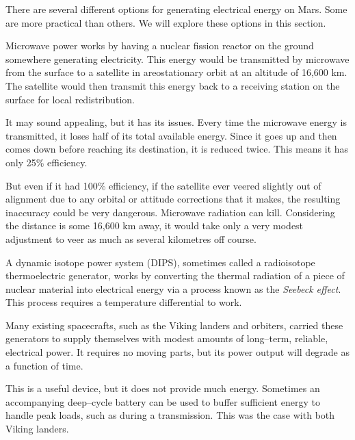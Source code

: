 

There are several different options for generating electrical energy on Mars. Some are more practical than others. We will explore these options in this section.

Microwave power works by having a nuclear fission reactor on the ground somewhere generating electricity. This energy would be transmitted by microwave from the surface to a satellite in areostationary orbit at an altitude of 16,600 km. The satellite would then transmit this energy back to a receiving station on the surface for local redistribution.

It may sound appealing, but it has its issues. Every time the microwave energy is transmitted, it loses half of its total available energy. Since it goes up and then comes down before reaching its destination, it is reduced twice. This means it has only 25\% efficiency.

But even if it had 100\% efficiency, if the satellite ever veered slightly out of alignment due to any orbital or attitude corrections that it makes, the resulting inaccuracy could be very dangerous. Microwave radiation can kill. Considering the distance is some 16,600 km away, it would take only a very modest adjustment to veer as much as several kilometres off course.

A dynamic isotope power system (DIPS), sometimes called a radioisotope thermoelectric generator, works by converting the thermal radiation of a piece of nuclear material into electrical energy via a process known as the {\it Seebeck effect}. This process requires a temperature differential to work.

Many existing spacecrafts, such as the Viking landers and orbiters, carried these generators to supply themselves with modest amounts of long--term, reliable, electrical power. It requires no moving parts, but its power output will degrade as a function of time.

This is a useful device, but it does not provide much energy. Sometimes an accompanying deep--cycle battery can be used to buffer sufficient energy to handle peak loads, such as during a transmission. This was the case with both Viking landers.

